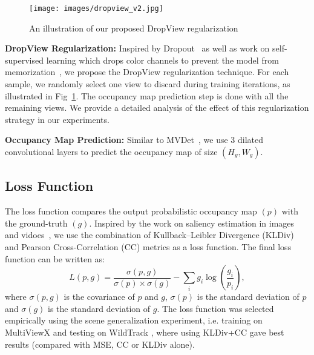 \documentclass[letterpaper, 10 pt, conference]{ieeeconf}  \usepackage{times}
\newcommand{\wildtrack}{WildTrack }
\newcommand{\multiviewx}{MultiViewX }
\begin{document}
 \begin{figure}
    \centering
    \texttt{[image: images/dropview\_v2.jpg]}
    \caption{An illustration of our proposed DropView regularization}
    \label{fig:dropview}
\end{figure}

\textbf{DropView Regularization:} Inspired by Dropout~\cite{srivastava2014dropout} as well as work on self-supervised learning which drops color channels to prevent the model from memorization~\cite{jenni2018self,lai2019self}, we propose the DropView regularization technique. For each sample, we randomly select one view to discard during training iterations, as illustrated in Fig~\ref{fig:dropview}. The occupancy map prediction step is done with all the remaining views. We provide a detailed analysis of the effect of this regularization strategy in our experiments.

\textbf{Occupancy Map Prediction:} Similar to MVDet~\cite{hou2020multiview}, we use 3 dilated convolutional layers to predict the occupancy map of size $(H_g,W_g)$. 

\subsection{Loss Function}
The loss function compares the output probabilistic occupancy map $(p)$ with the ground-truth $(g)$. Inspired by the work on saliency estimation in images and vidoes~\cite{bylinskii2018different,Reddy2020TidyingDS,jain2020vinet}, we use the combination of Kullback–Leibler Divergence (KLDiv) and Pearson Cross-Correlation (CC) metrics as a loss function. The final loss function can be written as:
\begin{equation}
L(p,g) = \frac{\sigma(p,g)}{\sigma(p) \times \sigma(g)} - \sum_{i}g_{i} \log \left( \frac{g_{i}}{p_{i}} \right), 
\end{equation} where $\sigma(p,g)$ is the covariance of $p$ and $g$, $\sigma(p)$ is the standard deviation of $p$ and $\sigma(g)$ is the standard deviation of $g$. The loss function was selected empirically using the scene generalization experiment, i.e. training on \multiviewx and testing on \wildtrack, where using KLDiv+CC gave best results (compared with MSE, CC or KLDiv alone). 
\end{document}
